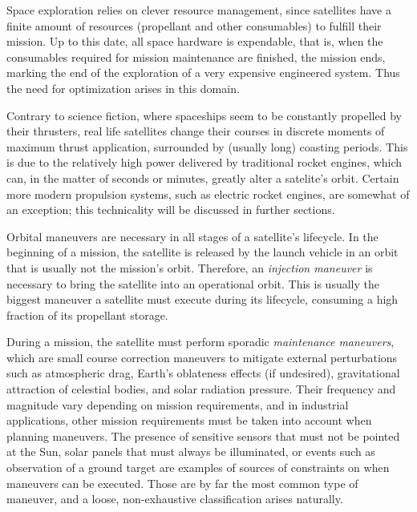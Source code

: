 






Space exploration relies on clever resource management, since satellites have a finite amount of resources (propellant and other consumables) to fulfill their mission. Up to this date, all space hardware is expendable, that is, when the consumables required for mission maintenance are finished, the mission ends, marking the end of the exploration of a very expensive engineered system. Thus the need for optimization arises in this domain.

Contrary to science fiction, where spaceships seem to be constantly propelled by their thrusters, real life satellites change their courses in discrete moments of maximum thrust application, surrounded by (usually long) coasting periods. This is due to the relatively high power delivered by traditional rocket engines, which can, in the matter of seconds or minutes, greatly alter a satelite's orbit. Certain more modern propulsion systems, such as electric rocket engines, are somewhat of an exception; this technicality will be discussed in further sections.

Orbital maneuvers are necessary in all stages of a satellite's lifecycle. In the beginning of a mission, the satellite is released by the launch vehicle in an orbit that is usually not the mission's orbit. Therefore, an \textit{injection maneuver} is necessary to bring the satellite into an operational orbit. This is usually the biggest maneuver a satellite must execute during its lifecycle, consuming a high fraction of its propellant storage. 

During a mission, the satellite must perform sporadic \textit{maintenance maneuvers}, which are small course correction maneuvers to mitigate external perturbations such as atmospheric drag, Earth's oblateness effects (if undesired), gravitational attraction of celestial bodies, and solar radiation pressure. Their frequency and magnitude vary depending on mission requirements, and in industrial applications, other mission requirements must be taken into account when planning maneuvers. The presence of sensitive sensors that must not be pointed at the Sun, solar panels that must always be illuminated, or events such as observation of a ground target are examples of sources of constraints on when maneuvers can be executed. Those are by far the most common type of maneuver, and a loose, non-exhaustive classification arises naturally.

